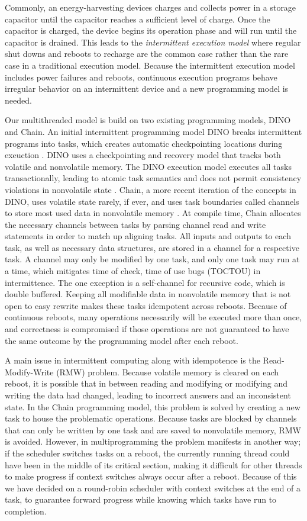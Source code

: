 \documentclass[11pt]{sensys-proc}
\begin{document}
Commonly, an energy-harvesting devices charges and collects power in a storage
capacitor until the capacitor reaches a sufficient level of charge.  Once the
capacitor is charged, the device begins its operation phase and will run until
the capacitor is drained.  This leads to the \textit{intermittent execution
model} where regular shut downs and reboots to recharge are the common case
rather than the rare case in a traditional execution model. Because the
intermittent execution model includes power failures and reboots, continuous
execution programs behave irregular behavior on an intermittent device and a new
programming model is needed.

Our multithreaded model is build on two existing programming models, DINO and
Chain.  An initial intermittent programming model DINO breaks intermittent
programs into tasks, which creates automatic checkpointing locations during
exeuction \cite{Dino}. DINO uses a checkpointing and recovery model that tracks
both volatile and nonvolatile memory.  The DINO execution model executes all
tasks transactionally, leading to atomic task semantics and does not permit
consistency violations in nonvolatile state \cite{Dino}. Chain, a more recent
iteration of the concepts in DINO, uses volatile state rarely, if ever, and uses
task boundaries called channels to store most used data in nonvolatile memory
\cite{Chain}. At compile time, Chain allocates the necessary channels between
tasks by parsing channel read and write statements in order to match up aligning
tasks. All inputs and outputs to each task, as well as necessary data
structures, are stored in a channel for a respective task. A channel may only be
modified by one task, and only one task may run at a time, which mitigates time
of check, time of use bugs (TOCTOU) in intermittence.  The one exception is a
self-channel for recursive code, which is double buffered.  Keeping all
modifiable data in nonvolatile memory that is not open to easy rewrite makes
these tasks idempotent across reboots.  Because of continuous reboots, many
operations necessarily will be executed more than once, and correctness is
compromised if those operations are not guaranteed to have the same outcome by
the programming model after each reboot.

A main issue in intermittent computing along with idempotence is the
Read-Modify-Write (RMW) problem.  Because volatile memory is cleared on each
reboot, it is possible that in between reading and modifying or modifying and
writing the data had changed, leading to incorrect answers and an inconsistent
state. In the Chain programming model, this problem is solved by creating a new
task to house the problematic operations. Because tasks are blocked by channels
that can only be written by one task and are saved to nonvolatile memory, RMW is
avoided.  However, in multiprogramming the problem manifests in another way; if
the scheduler switches tasks on a reboot, the currently running thread could
have been in the middle of its critical section, making it difficult for other
threads to make progress if context switches always occur after a reboot.
Because of this we have decided on a round-robin scheduler with context switches
at the end of a task, to guarantee forward progress while knowing which tasks
have run to completion.
\end{document}
